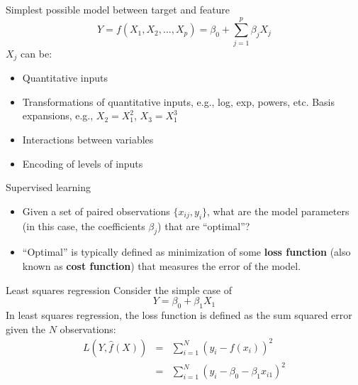 \documentclass[aspectratio=169]{beamer}
\begin{document}
\begin{frame}{Simplest possible model between target and feature}
    \begin{equation*}
        Y=f(X_1,X_2,...,X_p)= \beta_0 + \sum_{j=1}^p \beta_j X_j
    \end{equation*}
    $X_j$ can be:
    \begin{itemize}
        \item Quantitative inputs
        \item Transformations of quantitative inputs, e.g., log, exp, powers, etc.
        Basis expansions, e.g., $X_2 = X_1^2$, $X_3 = X_1^3$
        \item Interactions between variables
        \item Encoding of levels of inputs
    \end{itemize}
\end{frame}


\begin{frame}{Supervised learning}
    \begin{itemize}
        \item Given a set of paired observations $\{x_{ij}, y_i\}$, what are the model parameters (in this case, the coefficients $\beta_j$) that are ``optimal''?
        \item ``Optimal'' is typically defined as minimization of some \textbf{loss function} (also known as \textbf{cost function}) that measures the error of the model.
    \end{itemize}
\end{frame}


\begin{frame}{Least squares regression}
    Consider the simple case of
    \begin{equation*}
        Y = \beta_0 + \beta_1 X_1
    \end{equation*}
    In least squares regression, the loss function is defined as the sum squared error given the $N$ observations:
    \begin{eqnarray*}
        L(Y, \hat{f}(X)) & = & \sum_{i=1}^N (y_i - f(x_i))^2 \\
        & = & \sum_{i=1}^N (y_i - \beta_0 - \beta_1 x_{i1})^2
    \end{eqnarray*}
    \end{frame}
\end{document}
